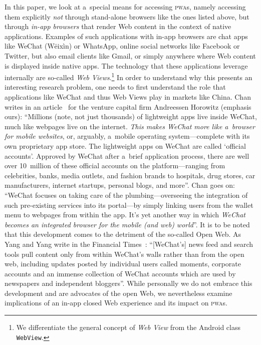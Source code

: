\documentclass[sigconf,hyphens]{acmart}
\begin{document}
In this paper, we look at a~special means for accessing \textsc{pwa}s,
namely accessing them explicitly \emph{not} through stand-alone browsers
like the ones listed above,
but through \emph{in-app browsers} that render Web content in the context of native applications.
Examples of such applications with in-app browsers are chat apps like WeChat (Wēixìn) or WhatsApp,
online social networks like Facebook or Twitter, but also email clients like Gmail,
or simply anywhere where Web content is displayed inside native apps.
The technology that these applications leverage internally are so-called
\emph{Web Views}.\footnote{We differentiate the general concept of \emph{Web View}
from the Android class \texttt{WebView}.}
In order to understand why this presents an interesting research problem,
one needs to first understand the role that applications like WeChat
and thus Web Views play in markets like China.
Chan writes in an article~\cite{chan2015wechat}
for the venture capital firm Andreessen Horowitz (emphasis ours):
``Millions (note, not just thousands) of lightweight apps live inside WeChat,
much like webpages live on the internet.
\emph{This makes WeChat more like a~browser for mobile websites}, or, arguably,
a~mobile operating system---complete with its own proprietary app store.
The lightweight apps on WeChat are called `official accounts'.
Approved by WeChat after a~brief application process,
there are well over 10~million of these official accounts on the platform---ranging
from celebrities, banks, media outlets, and fashion brands to hospitals, drug stores,
car manufacturers, internet startups, personal blogs, and more''.
Chan goes on: ``WeChat focuses on taking care of the plumbing---overseeing
the integration of such pre-existing services into its portal---by
simply linking users from the wallet menu to webpages from within the app.
It's yet another way in which \emph{WeChat
becomes an integrated browser for the mobile (and web) world}''.
It is to be noted that this development comes to the detriment of the so-called Open Web.
As Yang and Yang write in the Financial Times~\cite{yang2017tencent}:
``[WeChat's] news feed and search tools pull content only from within WeChat's walls
rather than from the open web, including updates posted by individual users called moments,
corporate accounts and an immense collection of WeChat accounts
which are used by newspapers and independent bloggers''.
While personally we do not embrace this development
and are advocates of the open Web,
we nevertheless examine implications of an in-app closed Web experience
and its impact on \textsc{pwa}s. 
\end{document}
